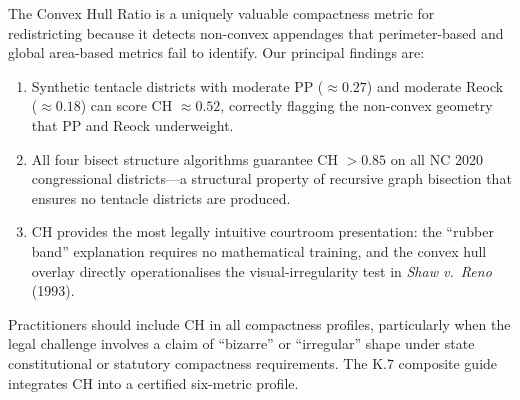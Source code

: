 The Convex Hull Ratio is a uniquely valuable compactness metric for redistricting
because it detects non-convex appendages that perimeter-based and global area-based
metrics fail to identify.
Our principal findings are:

\begin{enumerate}
  \item Synthetic tentacle districts with moderate PP ($\approx 0.27$) and
    moderate Reock ($\approx 0.18$) can score CH $\approx 0.52$, correctly
    flagging the non-convex geometry that PP and Reock underweight.
  \item All four bisect structure algorithms guarantee CH $> 0.85$ on all
    NC 2020 congressional districts---a structural property of recursive
    graph bisection that ensures no tentacle districts are produced.
  \item CH provides the most legally intuitive courtroom presentation:
    the ``rubber band'' explanation requires no mathematical training,
    and the convex hull overlay directly operationalises the visual-irregularity
    test in \textit{Shaw v.\ Reno} (1993).
\end{enumerate}

Practitioners should include CH in all compactness profiles, particularly
when the legal challenge involves a claim of ``bizarre'' or ``irregular'' shape
under state constitutional or statutory compactness requirements.
The K.7 composite guide integrates CH into a certified six-metric profile.
